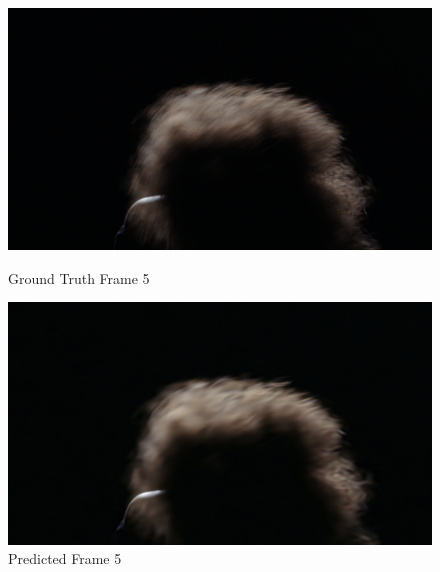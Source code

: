 \documentclass{ioereport}
\begin{document}
\begin{figure}[H]
    \centering
    \begin{minipage}{0.45\textwidth}
        \centering
        \includegraphics[width=\linewidth]{assets/video_results/im5.png}
        \caption{Ground Truth Frame 5}
        \label{fig:gt-frame-5}
    \end{minipage}\hfill
    \begin{minipage}{0.45\textwidth}
        \centering
        \includegraphics[width=\linewidth]{assets/video_results/pred4.png}
        \caption{Predicted Frame 5}
        \label{fig:pred-frame-5}
    \end{minipage}
\end{figure}
\end{document}
